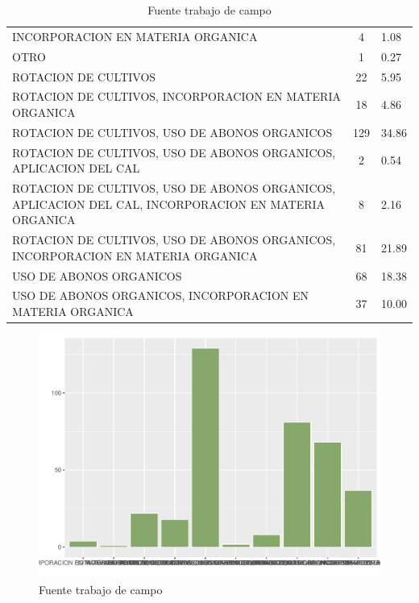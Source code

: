 \documentclass{article}\usepackage[]{graphicx}\usepackage[table]{xcolor}
\makeatletter
\def\maxwidth{ %
  \ifdim\Gin@nat@width>\linewidth
    \linewidth
  \else
    \Gin@nat@width
  \fi
}
\newenvironment{knitrout}{}{} %
\newenvironment{tablas}[2]
{\begin{table}[H]
		\centering
		\caption{#1}
		#2
		\caption*{Fuente trabajo de campo}}
	{\end{table}}
\newenvironment{fotos}[2]
{\begin{figure}[H]
	\centering
	\caption{#1}
	\texttt{[image: H:/Gore Cusco/Geragri/programa/analisis datos/fotos/\#2.jpg]}
	\caption*{Fuente: trabajo de campo}}
{\end{figure}}
\newenvironment{graficas}[2]
{\begin{figure}[H]
		\centering
		\caption{#1}
		#2
		\caption*{Fuente trabajo de campo}}
{\end{figure}}
\makeatother
\begin{document}
\begin{tablas}
{Practica de conservacion de suelos}{

\begin{tabular}{lcl}
\toprule
\cellcolor[HTML]{87A96B}{\textcolor{black}{\textbf{Personas}}} & \cellcolor[HTML]{87A96B}{\textcolor{black}{\textbf{Conteo}}} & \cellcolor[HTML]{87A96B}{\textcolor{black}{\textbf{Porcentaje}}}\\
\midrule
INCORPORACION EN MATERIA ORGANICA & 4 & 1.08\\
OTRO & 1 & 0.27\\
ROTACION DE CULTIVOS & 22 & 5.95\\
ROTACION DE CULTIVOS, INCORPORACION EN MATERIA ORGANICA & 18 & 4.86\\
ROTACION DE CULTIVOS, USO DE ABONOS ORGANICOS & 129 & 34.86\\
\addlinespace
ROTACION DE CULTIVOS, USO DE ABONOS ORGANICOS, APLICACION DEL CAL & 2 & 0.54\\
ROTACION DE CULTIVOS, USO DE ABONOS ORGANICOS, APLICACION DEL CAL, INCORPORACION EN MATERIA ORGANICA & 8 & 2.16\\
ROTACION DE CULTIVOS, USO DE ABONOS ORGANICOS, INCORPORACION EN MATERIA ORGANICA & 81 & 21.89\\
USO DE ABONOS ORGANICOS & 68 & 18.38\\
USO DE ABONOS ORGANICOS, INCORPORACION EN MATERIA ORGANICA & 37 & 10.00\\
\bottomrule
\end{tabular}


}
\end{tablas}
\begin{graficas}
{Practica de conservacion de suelos}{
\begin{knitrout}
\definecolor{shadecolor}{rgb}{0.969, 0.969, 0.969}\color{fgcolor}
\includegraphics[width=\maxwidth]{figure/fig_treintaycuatro-1} 
\end{knitrout}
}
\end{graficas}
\end{document}
